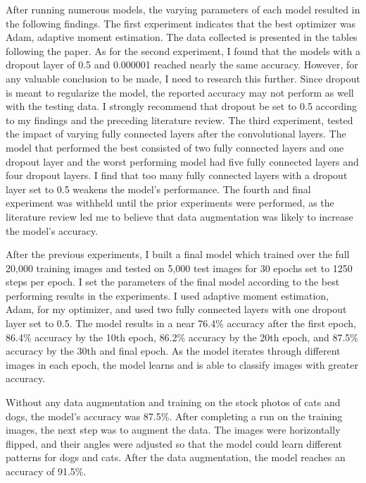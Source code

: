\documentclass[12pt,english]{article}
\begin{document}
After running numerous models, the varying parameters of each model resulted in the following findings. The first experiment indicates that the best optimizer was Adam, adaptive moment estimation. The data collected is presented in the tables following the paper. As for the second experiment, I found that the models with a dropout layer of 0.5 and 0.000001 reached nearly the same accuracy. However, for any valuable conclusion to be made, I need to research this further. Since dropout is meant to regularize the model, the reported accuracy may not perform as well with the testing data. I strongly recommend that dropout be set to 0.5 according to my findings and the preceding literature review. The third experiment, tested the impact of varying fully connected layers after the convolutional layers. The model that performed the best consisted of two fully connected layers and one dropout layer and the worst performing model had five fully connected layers and four dropout layers. I find that too many fully connected layers with a dropout layer set to 0.5 weakens the model’s performance. The fourth and final experiment was withheld until the prior experiments were performed, as the literature review led me to believe that data augmentation was likely to increase the model’s accuracy. \par

After the previous experiments, I built a final model which trained over the full 20,000 training images and tested on 5,000 test images for 30 epochs set to 1250 steps per epoch. I set the parameters of the final model according to the best performing results in the experiments. I used adaptive moment estimation, Adam, for my optimizer, and used two fully connected layers with one dropout layer set to 0.5. The model results in a near 76.4\% accuracy after the first epoch, 86.4\% accuracy by the 10th epoch, 86.2\% accuracy by the 20th epoch, and 87.5\% accuracy by the 30th and final epoch. As the model iterates through different images in each epoch, the model learns and is able to classify images with greater accuracy. \par

Without any data augmentation and training on the stock photos of cats and dogs, the model’s accuracy was 87.5\%. After completing a run on the training images, the next step was to augment the data. The images were horizontally flipped, and their angles were adjusted so that the model could learn different patterns for dogs and cats. After the data augmentation, the model reaches an accuracy of 91.5\%.\par
\end{document}
